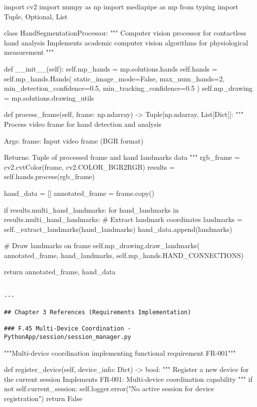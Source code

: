 \documentclass[11pt,a4paper]{report}
\begin{document}
import cv2
import numpy as np
import mediapipe as mp
from typing import Tuple, Optional, List


class HandSegmentationProcessor:
    """
    Computer vision processor for contactless hand analysis
    Implements academic computer vision algorithms for physiological measurement
    """

    def \_\_init\_\_(self):
        self.mp\_hands = mp.solutions.hands
        self.hands = self.mp\_hands.Hands(
            static\_image\_mode=False,
            max\_num\_hands=2,
            min\_detection\_confidence=0.5,
            min\_tracking\_confidence=0.5
        )
        self.mp\_drawing = mp.solutions.drawing\_utils

    def process\_frame(self, frame: np.ndarray) -> Tuple[np.ndarray, List[Dict]]:
        """
        Process video frame for hand detection and analysis

        Args:
            frame: Input video frame (BGR format)

        Returns:
            Tuple of processed frame and hand landmarks data
        """
        rgb\_frame = cv2.cvtColor(frame, cv2.COLOR\_BGR2RGB)
        results = self.hands.process(rgb\_frame)

        hand\_data = []
        annotated\_frame = frame.copy()

        if results.multi\_hand\_landmarks:
            for hand\_landmarks in results.multi\_hand\_landmarks:
                \# Extract landmark coordinates
                landmarks = self.\_extract\_landmarks(hand\_landmarks)
                hand\_data.append(landmarks)

                \# Draw landmarks on frame
                self.mp\_drawing.draw\_landmarks(
                    annotated\_frame, hand\_landmarks, self.mp\_hands.HAND\_CONNECTIONS)

        return annotated\_frame, hand\_data
\begin{verbatim}

---

## Chapter 3 References (Requirements Implementation)

### F.45 Multi-Device Coordination - PythonApp/session/session_manager.py

\end{verbatim}
"""Multi-device coordination implementing functional requirement FR-001"""


def register\_device(self, device\_info: Dict) -> bool:
    """
    Register a new device for the current session
    Implements FR-001: Multi-device coordination capability
    """
    if not self.current\_session:
        self.logger.error("No active session for device registration")
        return False
\end{document}
